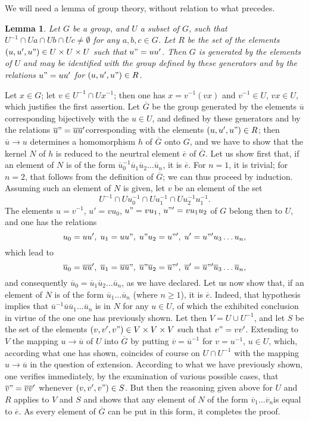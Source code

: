 \documentclass[12pt]{amsart}
\newtheorem{lemma}{Lemma}
\begin{document}
We will need a lemma of group theory, without relation to what precedes.
\begin{lemma}
Let $G$ be a group, and $U$ a subset of $G$, such that $U^{-1}\cap Ua\cap Ub\cap Uc\neq\emptyset$
for any $a,b,c\in G$. Let $R$ be the set of the elements $(u,u',u")\in U\times U\times U$
such that $u"=uu'$. Then $G$ is generated by the elements of $U$
and may be identified with the group defined by these generators and
by the relations $u"=uu'$ for $(u,u',u")\in R$.
\end{lemma}
Let $x\in G$; let $v\in U^{-1}\cap Ux^{-1}$; then one has $x=v^{-1}(vx)$
and $v^{-1}\in U$, $vx\in U$, which justifies the first assertion.
Let $\overline{G}$ be the group generated by the elements $\overline{u}$
corresponding bijectively with the $u\in U$, and defined by these
generators and by the relations $\overline{u}"=\overline{u}\overline{u}'$corresponding
with the elements $(u,u',u")\in R$; then $\overline{u}\to u$ determines
a homomorphism $h$ of $\overline{G}$ onto $G$, and we have to show
that the kernel $N$ of $h$ is reduced to the neurtral element $\overline{e}$
of $\overline{G}$. Let us show first that, if an element of $N$
is of the form $\overline{u}_{0}^{-1}\overline{u}_{1}\overline{u}_{2}\ldots\overline{u}_{n}$,
it is $\overline{e}$. For $n=1$, it is trivial; for $n=2$, that
follows from the definition of $\overline{G}$; we can thus proceed
by induction. Assuming such an element of $N$ is given, let $v$
be an element of the set\[
U^{-1}\cap Uu_{0}^{-1}\cap Uu_{1}^{-1}\cap Uu_{2}^{-1}u_{1}^{-1}.\]
The elements $u=v^{-1}$, $u'=vu_{0}$, $u"=vu_{1}$, $u"'=vu_{1}u_{2}$
of $G$ belong then to $U$, and one has the relations\[
u_{0}=uu',\; u_{1}=uu",\; u"u_{2}=u"',\; u'=u"'u_{3}\ldots u_{n},\]
which lead to\[
\overline{u}_{0}=\overline{u}\overline{u}',\;\overline{u}_{1}=\overline{u}\overline{u}",\;\overline{u}"\overline{u}_{2}=\overline{u}"',\;\overline{u}'=\overline{u}"'\overline{u}_{3}\ldots\overline{u}_{n},\]
and consequently $\overline{u}_{0}=\overline{u}_{1}\overline{u}_{2}\ldots\overline{u}_{n}$,
as we have declared. Let us now show that, if an element of $N$ is
of the form $\overline{u}_{1}\ldots\overline{u}_{n}$ (where $n\geq1$),
it is $\overline{e}$. Indeed, that hypothesis implies that $\overline{u}^{-1}\overline{u}\overline{u}_{1}\ldots\overline{u}_{n}$
is in $N$ for any $u\in U$, of which the exhibited conclusion in
virtue of the one one has previously shown. Let then $V=U\cup U^{-1}$,
and let $S$ be the set of the elements $(v,v',v")\in V\times V\times V$
such that $v"=vv'$. Extending to $V$ the mapping $u\to\overline{u}$
of $U$ into $\overline{G}$ by putting $\overline{v}=\overline{u}^{-1}$
for $v=u^{-1}$, $u\in U$, which, according what one has shown, coincides
of course on $U\cap U^{-1}$ with the mapping $u\to\overline{u}$
in the question of extension. According to what we have previously
shown, one verifies immediately, by the examination of various possible
cases, that $\overline{v}"=\overline{v}\overline{v}'$ whenever $(v,v',v")\in S$.
But then the reasoning given above for $U$ and $R$ applies to $V$
and $S$ and shows that any element of $N$ of the form $\overline{v}_{1}\ldots\overline{v}_{n}$is
equal to $\overline{e}$. As every element of $\overline{G}$ can
be put in this form, it completes the proof.
\end{document}
